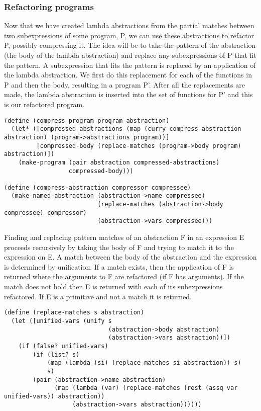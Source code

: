 \documentclass[a4paper,10pt]{article}
\begin{document}
\subsubsection{Refactoring programs}
Now that we have created lambda abstractions from the partial matches between two subexpressions of some program, P, we can use these abstractions to refactor P, possibly compressing it.  The idea will be to take the pattern of the abstraction (the body of the lambda abstraction) and replace any subexpressions of P that fit the pattern.  A subexpression that fits the pattern is replaced by an application of the lambda abstraction.  We first do this replacement for each of the functions in P and then the body, resulting in a program P'.  After all the replacements are made, the lambda abstraction is inserted into the set of functions for P' and this is our refactored program.
\begin{lstlisting}[frame=trbl]
(define (compress-program program abstraction)
  (let* ([compressed-abstractions (map (curry compress-abstraction abstraction) (program->abstractions program))]
         [compressed-body (replace-matches (program->body program) abstraction)])
    (make-program (pair abstraction compressed-abstractions)
                  compressed-body)))

(define (compress-abstraction compressor compressee)
  (make-named-abstraction (abstraction->name compressee)
                          (replace-matches (abstraction->body compressee) compressor)
                          (abstraction->vars compressee)))                           
\end{lstlisting}
Finding and replacing pattern matches of an abstraction F in an expression E proceeds recursively by taking the body of F and trying to match it to the expression on E.  A match between the body of the abstraction and the expression is determined by unification. If a match exists, then the application of F is returned where the arguments to F are refactored (if F has arguments).  If the match does not hold then E is returned with each of its subexpressions refactored.  If E is a primitive and not a match it is returned.

\begin{lstlisting}[frame=trbl]
(define (replace-matches s abstraction)
  (let ([unified-vars (unify s
                             (abstraction->body abstraction)
                             (abstraction->vars abstraction))])
    (if (false? unified-vars)
        (if (list? s)
            (map (lambda (si) (replace-matches si abstraction)) s)
            s)
        (pair (abstraction->name abstraction)
              (map (lambda (var) (replace-matches (rest (assq var unified-vars)) abstraction))
                   (abstraction->vars abstraction))))))
\end{lstlisting}
\end{document}
